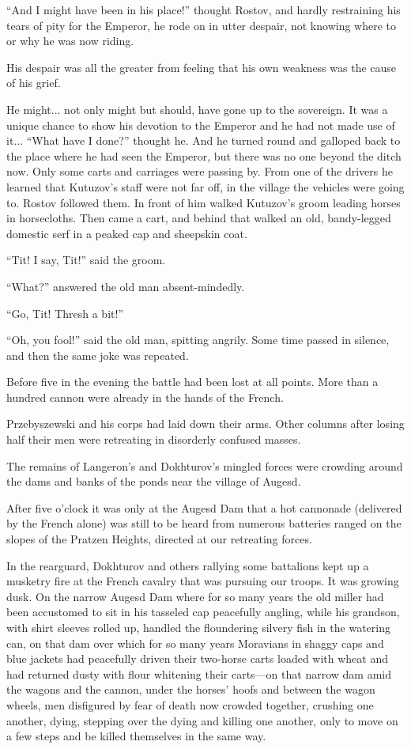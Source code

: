 ``And I might have been in his place!'' thought Rostov, and
hardly restraining his tears of pity for the Emperor, he rode on
in utter despair, not knowing where to or why he was now riding.

His despair was all the greater from feeling that his own
weakness was the cause of his grief.

He might... not only might but should, have gone up to the
sovereign. It was a unique chance to show his devotion to the
Emperor and he had not made use of it... ``What have I done?''
thought he. And he turned round and galloped back to the place
where he had seen the Emperor, but there was no one beyond the
ditch now. Only some carts and carriages were passing by. From
one of the drivers he learned that Kutuzov's staff were not far
off, in the village the vehicles were going to. Rostov followed
them. In front of him walked Kutuzov's groom leading horses in
horsecloths. Then came a cart, and behind that walked an old,
bandy-legged domestic serf in a peaked cap and sheepskin coat.

``Tit! I say, Tit!'' said the groom.

``What?'' answered the old man absent-mindedly.

``Go, Tit! Thresh a bit!''

``Oh, you fool!'' said the old man, spitting angrily. Some time
passed in silence, and then the same joke was repeated.

Before five in the evening the battle had been lost at all
points. More than a hundred cannon were already in the hands of
the French.

Przebyszewski and his corps had laid down their arms. Other
columns after losing half their men were retreating in disorderly
confused masses.

The remains of Langeron's and Dokhturov's mingled forces were
crowding around the dams and banks of the ponds near the village
of Augesd.

After five o'clock it was only at the Augesd Dam that a hot
cannonade (delivered by the French alone) was still to be heard
from numerous batteries ranged on the slopes of the Pratzen
Heights, directed at our retreating forces.

In the rearguard, Dokhturov and others rallying some battalions
kept up a musketry fire at the French cavalry that was pursuing
our troops. It was growing dusk. On the narrow Augesd Dam where
for so many years the old miller had been accustomed to sit in
his tasseled cap peacefully angling, while his grandson, with
shirt sleeves rolled up, handled the floundering silvery fish in
the watering can, on that dam over which for so many years
Moravians in shaggy caps and blue jackets had peacefully driven
their two-horse carts loaded with wheat and had returned dusty
with flour whitening their carts---on that narrow dam amid the
wagons and the cannon, under the horses' hoofs and between the
wagon wheels, men disfigured by fear of death now crowded
together, crushing one another, dying, stepping over the dying
and killing one another, only to move on a few steps and be
killed themselves in the same way.

